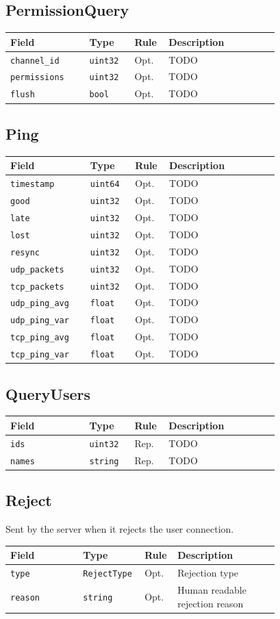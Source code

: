 \documentclass[11pt]{article} %
\newenvironment{mumbleMessageEx}
{%
	\small
	\renewcommand\arraystretch{1.5}
	\begin{tabular}{p{0.25\linewidth}p{0.13\linewidth}p{0.05\linewidth}p{0.35\linewidth}}
	Field & Type & Rule & Description \\
	\hline
}
{%
	\end{tabular}
	\renewcommand\arraystretch{1.0}
}
\newcommand{\mumbleMessageExItem}[4]{ \texttt{#1} & \texttt{#2} & #3 & #4 \\ }
\begin{document}
\subsection{PermissionQuery}

\begin{mumbleMessageEx}
\mumbleMessageExItem{channel\_id}{uint32}{Opt.}{TODO}
\mumbleMessageExItem{permissions}{uint32}{Opt.}{TODO}
\mumbleMessageExItem{flush}{bool}{Opt.}{TODO}
\end{mumbleMessageEx}

\subsection{Ping}

\begin{mumbleMessageEx}
\mumbleMessageExItem{timestamp}{uint64}{Opt.}{TODO}
\mumbleMessageExItem{good}{uint32}{Opt.}{TODO}
\mumbleMessageExItem{late}{uint32}{Opt.}{TODO}
\mumbleMessageExItem{lost}{uint32}{Opt.}{TODO}
\mumbleMessageExItem{resync}{uint32}{Opt.}{TODO}
\mumbleMessageExItem{udp\_packets}{uint32}{Opt.}{TODO}
\mumbleMessageExItem{tcp\_packets}{uint32}{Opt.}{TODO}
\mumbleMessageExItem{udp\_ping\_avg}{float}{Opt.}{TODO}
\mumbleMessageExItem{udp\_ping\_var}{float}{Opt.}{TODO}
\mumbleMessageExItem{tcp\_ping\_avg}{float}{Opt.}{TODO}
\mumbleMessageExItem{tcp\_ping\_var}{float}{Opt.}{TODO}
\end{mumbleMessageEx}

\subsection{QueryUsers}

\begin{mumbleMessageEx}
\mumbleMessageExItem{ids}{uint32}{Rep.}{TODO}
\mumbleMessageExItem{names}{string}{Rep.}{TODO}
\end{mumbleMessageEx}

\subsection{Reject}

Sent by the server when it rejects the user connection.

\begin{mumbleMessageEx}
\mumbleMessageExItem{type}{RejectType}{Opt.}{Rejection type}
\mumbleMessageExItem{reason}{string}{Opt.}{Human readable rejection reason}
\end{mumbleMessageEx}
\end{document}
